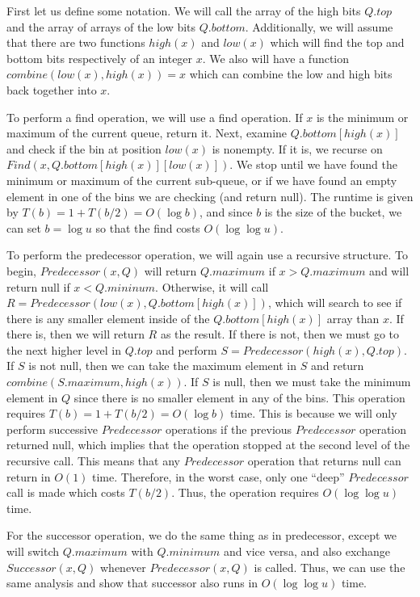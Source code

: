 \documentclass[psamsfonts]{amsart}
\newenvironment{sol}{\vspace{0.25cm}{\large \bfseries Solution:}}{\qedsymbol}
\begin{document}
\begin{sol}
First let us define some notation. We will call the array of the high bits $Q.top$ and the array of arrays of the low bits $Q.bottom$. Additionally, we will assume that there are two functions $high(x)$ and $low(x)$ which will find the top and bottom bits respectively of an integer $x$. We also will have a function $combine(low(x), high(x)) = x$ which can combine the low and high bits back together into $x$. 

To perform a find operation, we will use a find operation. If $x$ is the minimum or maximum of the current queue, return it. Next, examine $Q.bottom[high(x)]$ and check if the bin at position $low(x)$ is nonempty. If it is, we recurse on $Find(x, Q.bottom[high(x)][low(x)])$. We stop until we have found the minimum or maximum of the current sub-queue, or if we have found an empty element in one of the bins we are checking (and return null). The runtime is given by $T(b) = 1 + T(b/2) = O(\log b)$, and since $b$ is the size of the bucket, we can set $b = \log u$ so that the find costs $O(\log \log u)$.

To perform the predecessor operation, we will again use a recursive structure. To begin, $Predecessor(x, Q)$ will return $Q.maximum$ if $x > Q.maximum$ and will return null if $x < Q.mininum$. Otherwise, it will call $R = Predecessor(low(x), Q.bottom[high(x)])$, which will search to see if there is any smaller element inside of the $Q.bottom[high(x)]$ array than $x$. If there is, then we will return $R$ as the result. If there is not, then we must go to the next higher level in $Q.top$ and perform $S = Predecessor(high(x), Q.top)$. If $S$ is not null, then we can take the maximum element in $S$ and return $combine(S.maximum, high(x))$. If $S$ is null, then we must take the minimum element in $Q$ since there is no smaller element in any of the bins. This operation requires $T(b) = 1 + T(b/2) = O(\log b)$ time. This is because we will only perform successive $Predecessor$ operations if the previous $Predecessor$ operation returned null, which implies that the operation stopped at the second level of the recursive call. This means that any $Predecessor$ operation that returns null can return in $O(1)$ time. Therefore, in the worst case, only one ``deep'' $Predecessor$ call is made which costs $T(b/2)$. Thus, the operation requires $O(\log \log u)$ time.  

For the successor operation, we do the same thing as in predecessor, except we will switch $Q.maximum$ with $Q.minimum$ and vice versa, and also exchange $Successor(x, Q)$ whenever $Predecessor(x,Q)$ is called. Thus, we can use the same analysis and show that successor also runs in $O(\log \log u)$ time.


\end{sol}
\end{document}
